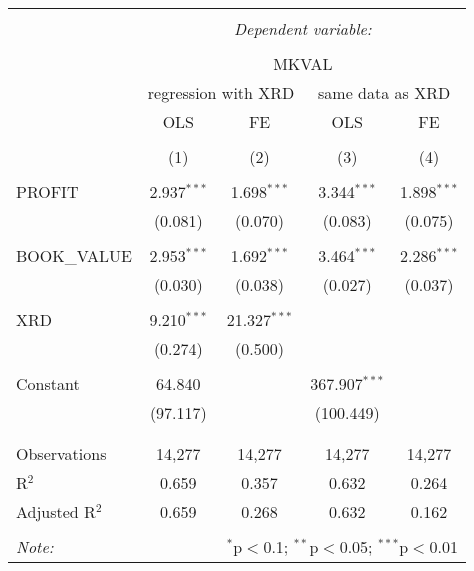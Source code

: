 \documentclass[11pt, letterpaper]{article}
\begin{document}
\begin{table}[!htbp] \centering
\caption{}
\label{5}
\begin{tabular}{@{\extracolsep{5pt}}lcccc}
\\[-1.8ex]\hline
\hline \\[-1.8ex]
& \multicolumn{4}{c}{\textit{Dependent variable:}} \\
\cline{2-5}
\\[-1.8ex] & \multicolumn{4}{c}{MKVAL} \\
& \multicolumn{2}{c}{regression with XRD} & \multicolumn{2}{c}{same data as XRD} \\
& OLS & FE & OLS & FE \\
\\[-1.8ex] & (1) & (2) & (3) & (4)\\
\hline \\[-1.8ex]
PROFIT & 2.937$^{***}$ & 1.698$^{***}$ & 3.344$^{***}$ & 1.898$^{***}$ \\
& (0.081) & (0.070) & (0.083) & (0.075) \\
& & & & \\
BOOK\_VALUE & 2.953$^{***}$ & 1.692$^{***}$ & 3.464$^{***}$ & 2.286$^{***}$ \\
& (0.030) & (0.038) & (0.027) & (0.037) \\
& & & & \\
XRD & 9.210$^{***}$ & 21.327$^{***}$ & & \\
& (0.274) & (0.500) & & \\
& & & & \\
Constant & 64.840 & & 367.907$^{***}$ & \\
& (97.117) & & (100.449) & \\
& & & & \\
\hline \\[-1.8ex]
Observations & 14,277 & 14,277 & 14,277 & 14,277 \\
R$^{2}$ & 0.659 & 0.357 & 0.632 & 0.264 \\
Adjusted R$^{2}$ & 0.659 & 0.268 & 0.632 & 0.162 \\
\hline
\hline \\[-1.8ex]
\textit{Note:} & \multicolumn{4}{r}{$^{*}$p$<$0.1; $^{**}$p$<$0.05; $^{***}$p$<$0.01} \\
\end{tabular}
\end{table}







\end{document}
